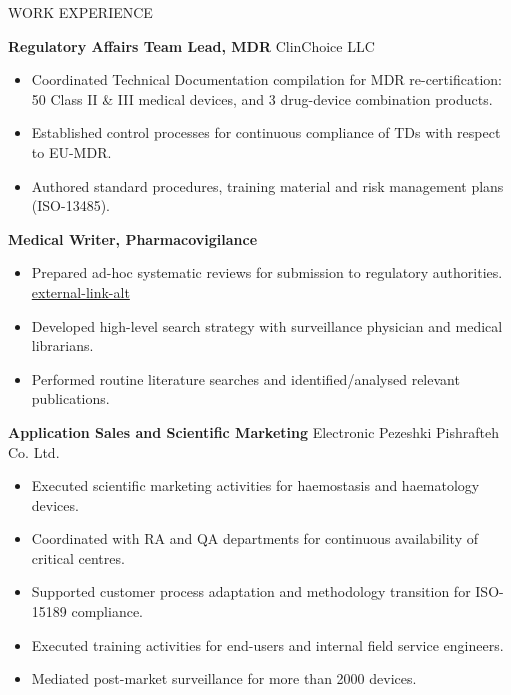 \documentclass{resume}
\begin{document}
\begin{rSection}{WORK EXPERIENCE}
\vspace{-1em}
\item \textbf{Regulatory Affairs Team Lead, MDR} \hfill {ClinChoice LLC}
\begin{itemize}
    \itemsep -2.25pt {}
    \item Coordinated Technical Documentation compilation for MDR re-certification:\hfill {\tiny{\href{https://clinchoice.com/solutions/medical-device-regulatory-affairs/technical-document-submission-approval-preparation}{}}}\\
          50 Class II \& III medical devices, and 3 drug-device combination products.
    \item Established control processes for continuous compliance of TDs with respect to EU-MDR.
    \item Authored standard procedures, training material and risk management plans (\textsc{ISO-13485}).
\end{itemize}

\item \textbf{Medical Writer, Pharmacovigilance}
\begin{itemize}
    \itemsep -2.25pt {}
    \item Prepared ad-hoc systematic reviews for submission to regulatory authorities. \hfill {\tiny {\href{https://clinchoice.com/solutions/medical-device-safety/literature-monitoring/}{\faIcon
{external-link-alt}}}}
    \item Developed high-level search strategy with surveillance physician and medical librarians. 
    \item Performed routine literature searches and identified/analysed relevant publications.\\
\end{itemize}

\item \textbf{Application Sales and Scientific Marketing} \hfill {Electronic Pezeshki Pishrafteh Co. Ltd.}
\begin{itemize}
    \itemsep -2.25pt {} 
    \item Executed scientific marketing activities for haemostasis and haematology devices.\hfill {\tiny \href{https://www.sysmex-europe.com/company/contacts/distributors.html}{}}
    \item Coordinated with RA and QA departments for continuous availability of critical centres.
    \item Supported customer process adaptation and methodology transition for \textsc{ISO-15189} compliance.
    \item Executed training activities for end-users and internal field service engineers.
    \item Mediated post-market surveillance for more than 2000 devices.
\end{itemize}

\end{rSection}
     \newpage
\end{document}
